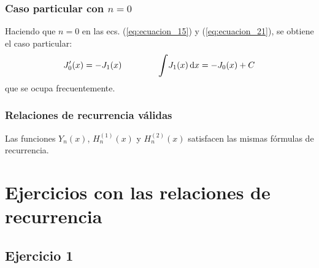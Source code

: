 \documentclass[12pt]{beamer}
\begin{document}
\begin{frame}
\frametitle{Caso particular con $n = 0$}
Haciendo que $n = 0$ en las ecs. (\ref{eq:ecuacion_15}) y (\ref{eq:ecuacion_21}), se obtiene el caso particular:
\pause
\begin{align*}
\pderivada{J}_{0} (x) = - J_{1}(x) \hspace{1.5cm} \scaleint{6ex} J_{1}(x) \dd{x} = - J_{0}(x) + C
\end{align*}
que se ocupa frecuentemente.
\end{frame}
\begin{frame}
\frametitle{Relaciones de recurrencia válidas}
Las funciones $Y_{n}(x)$, $H_{n}^{(1)} (x)$ y $H_{n}^{(2)} (x)$ satisfacen las mismas fórmulas de recurrencia.
\end{frame}

\section{Ejercicios con las relaciones de recurrencia}
\subsection{Ejercicio 1}
\end{document}
